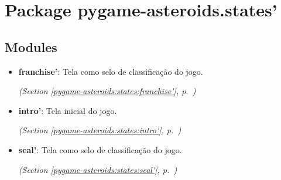 %
%
%


\section{Package pygame-asteroids.states'}

    \label{pygame-asteroids:states'}


\subsection{Modules}

\begin{itemize}
\setlength{\parskip}{0ex}
\item \textbf{franchise'}: Tela como selo de classificação do jogo.



  \textit{(Section \ref{pygame-asteroids:states:franchise'}, p.~\pageref{pygame-asteroids:states:franchise'})}

\item \textbf{intro'}: Tela inicial do jogo.



  \textit{(Section \ref{pygame-asteroids:states:intro'}, p.~\pageref{pygame-asteroids:states:intro'})}

\item \textbf{seal'}: Tela como selo de classificação do jogo.



  \textit{(Section \ref{pygame-asteroids:states:seal'}, p.~\pageref{pygame-asteroids:states:seal'})}

\end{itemize}



